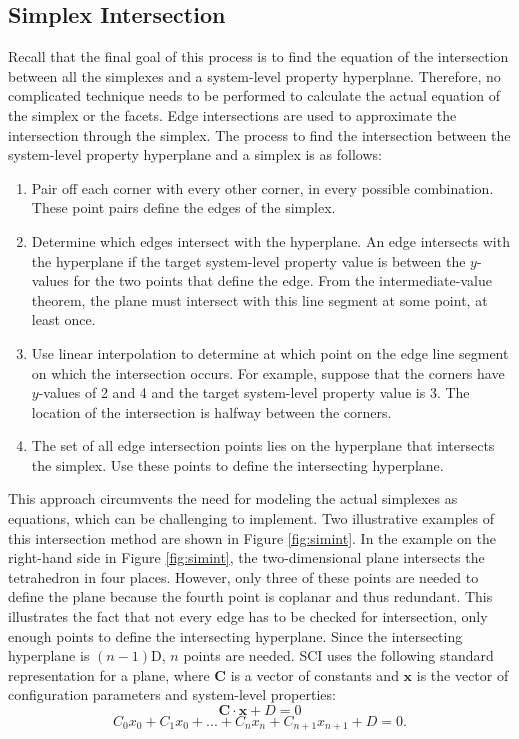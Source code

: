 \subsection{Simplex Intersection}
Recall that the final goal of this process is to find the equation of the intersection between all the simplexes and a system-level property hyperplane.
Therefore, no complicated technique needs to be performed to calculate the actual equation of the simplex or the facets.
Edge intersections are used to approximate the intersection through the simplex.
The process to find the intersection between the system-level property hyperplane and a simplex is as follows:
\begin{enumerate}
   \item Pair off each corner with every other corner, in every possible combination. These point pairs define the edges of the simplex.
   \item Determine which edges intersect with the hyperplane. An edge intersects with the hyperplane if the target system-level property value  is between the $y$-values for the two points that define the edge. From the intermediate-value theorem, the plane must intersect with this line segment at some point, at least once.
   \item Use linear interpolation to determine at which point on the edge line segment on which the intersection occurs.
For example, suppose that the corners have $y$-values of 2 and 4 and the target system-level property value is 3.
The location of the intersection is halfway between the corners.
   \item The set of all edge intersection points lies on the hyperplane that intersects the simplex. Use these points to define the intersecting hyperplane.
\end{enumerate}
This approach circumvents the need for modeling the actual simplexes as equations, which can be challenging to implement.
Two illustrative examples of this intersection method are shown in Figure \ref{fig:simint}.
In the example on the right-hand side in Figure \ref{fig:simint}, the two-dimensional plane intersects the tetrahedron in four places.
However, only three of these points are needed to define the plane because the fourth point is coplanar and thus redundant.
This illustrates the fact that not every edge has to be checked for intersection, only enough points to define the intersecting hyperplane.
Since the intersecting hyperplane is $(n-1)$D, $n$ points are needed.
SCI uses the following standard representation for a plane, where $\mathbf C$ is a vector of constants and $\mathbf x$ is the vector of configuration parameters and system-level properties:
\[\mathbf C \cdot \mathbf x + D = 0\]
\[C_0 x_0 + C_1 x_0 + ... + C_n x_n + C_{n+1} x_{n+1} + D = 0. \]


